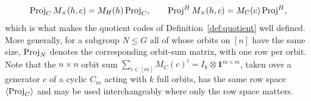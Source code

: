 \begin{enumerate}
    \[
        \mathrm{Proj}_C\, M_\times(h,c) = M_H(h)\,\mathrm{Proj}_C,
        \qquad
        \mathrm{Proj}^H\, M_\times(h,c) = M_C(c)\,\mathrm{Proj}^H,
    \]
    which is what makes the quotient codes of Definition~\ref{def:quotient} well defined. More generally, for a subgroup $N\leq G$ all of whose orbits on $[n]$ have the same size, $\mathrm{Proj}_N$ denotes the corresponding orbit-sum matrix, with one row per orbit. Note that the $n\times n$ orbit sum $\sum_{i\in[m]}M_C(c)^i = I_k\otimes\textbf{1}^{m\times m}$, taken over a generator $c$ of a cyclic $C_m$ acting with $k$ full orbits, has the same row space $\langle \mathrm{Proj}_C \rangle$ and may be used interchangeably where only the row space matters.
\end{enumerate}